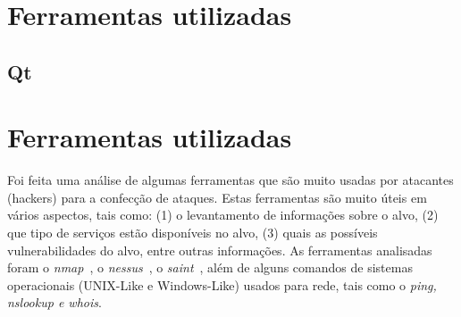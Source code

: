 \documentclass[brazil]{abnt}
\begin{document}




\chapter{Ferramentas utilizadas}

\section{Qt}
\label{ferramentas-qt}




\chapter{Ferramentas utilizadas}

Foi feita uma análise de algumas ferramentas que são muito usadas
por atacantes (hackers) para a confecção de ataques. Estas ferramentas
são muito úteis em vários aspectos, tais como: (1) o levantamento
de informações sobre o alvo, (2) que tipo de serviços estão disponíveis
no alvo, (3) quais as possíveis vulnerabilidades do alvo, entre outras
informações. As ferramentas analisadas foram o \emph{nmap}~,
o \emph{nessus}~, o \emph{saint}~, além
de alguns comandos de sistemas operacionais (UNIX-Like e Windows-Like)
usados para rede, tais como o \emph{ping, nslookup e whois}. 
\end{document}
